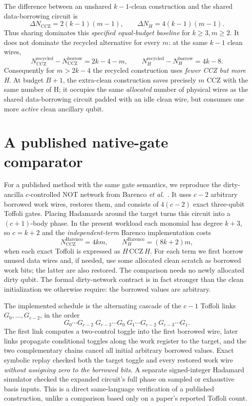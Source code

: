 \documentclass[11pt,a4paper]{article}
\begin{document}
The difference between an unshared $k-1$-clean construction and the shared data-borrowing circuit is
\begin{equation}\label{eq:sharing}
 \Delta N_{\mathrm{CCZ}}=2(k-1)(m-1),\qquad
 \Delta N_H=4(k-1)(m-1).
\end{equation}
Thus sharing dominates this \emph{specified equal-budget baseline} for $k\ge3,m\ge2$. It does not dominate the recycled alternative for every $m$: at the same $k-1$ clean wires,
\begin{equation}\label{eq:crossover}
 N_{\mathrm{CCZ}}^{\mathrm{recycled}}-N_{\mathrm{CCZ}}^{\mathrm{borrow}}=2k-4-m,
\qquad N_H^{\mathrm{recycled}}-N_H^{\mathrm{borrow}}=4k-8.
\end{equation}
Consequently for $m>2k-4$ the recycled construction uses \emph{fewer CCZ but more H}. At budget $B+1$, the extra-clean construction saves precisely $m$ CCZ with the same number of H; it occupies the same \emph{allocated} number of physical wires as the shared data-borrowing circuit padded with an idle clean wire, but consumes one more \emph{active} clean ancillary qubit.

\section{A published native-gate comparator}
For a published method with the same gate semantics, we reproduce the dirty-ancilla $c$-controlled NOT network from Barenco \emph{et al.}\ \cite[Lemma 7.2]{barenco}. It uses $c-2$ arbitrary borrowed work wires, restores them, and consists of $4(c-2)$ exact three-qubit Toffoli gates. Placing Hadamards around the target turns this circuit into a $(c+1)$-body phase. In the present workload each monomial has degree $k+3$, so $c=k+2$ and the \emph{independent-term} Barenco implementation costs
\begin{equation}\label{eq:barenco}
 N_{\mathrm{CCZ}}^{\mathrm{Barenco}}=4km,\qquad
 N_H^{\mathrm{Barenco}}=(8k+2)m,
\end{equation}
when each exact Toffoli is expressed as $H\,\mathrm{CCZ}\,H$. For each term we first borrow unused data wires and, if needed, use some allocated clean scratch as borrowed work bits; the latter are also restored. The comparison needs no newly allocated dirty qubit. The formal dirty-network contract is in fact stronger than the clean initialization we otherwise require: the borrowed values are arbitrary.

The implemented schedule is the alternating cascade of the $c-1$ Toffoli links $G_0,\ldots,G_{c-2}$, in the order
\[
 G_0\cdots G_{c-2}\;G_{c-3}\cdots G_0\;
 G_1\cdots G_{c-2}\;G_{c-3}\cdots G_1.
\]
The first link computes a two-control toggle into the first borrowed wire, later links propagate conditional toggles along the work register to the target, and the two complementary chains cancel all initial arbitrary borrowed values. Exact symbolic replay checked both the target toggle and every restored work wire \emph{without assigning zero to the borrowed bits}. A separate signed-integer Hadamard simulator checked the expanded circuit's full phase on sampled or exhaustive basis inputs. This is a direct same-language verification of a published construction, unlike a comparison based only on a paper's reported Toffoli count.
\end{document}
